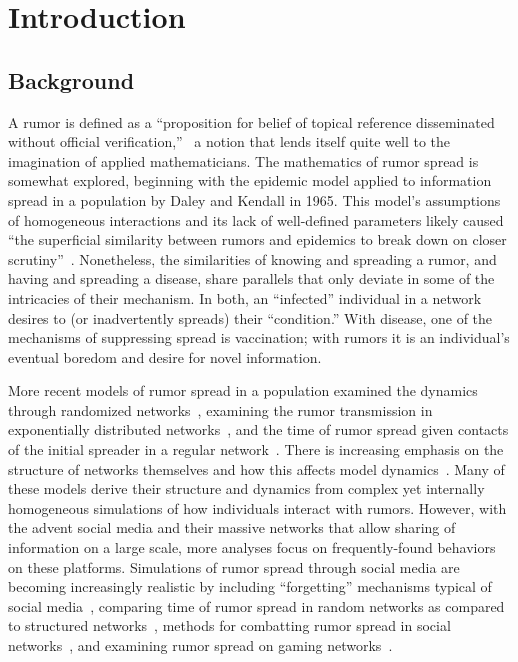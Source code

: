 \section{Introduction }
\label{sec:introduction}

\subsection{Background}
\label{subsec:background}

A rumor is defined as a ``proposition for belief of topical reference disseminated without official verification,''~\cite{knapp-1944} a notion that lends itself quite well to the imagination of applied mathematicians.
The mathematics of rumor spread is somewhat explored, beginning with the epidemic model applied to information spread in a population by Daley and Kendall in 1965.
This model's assumptions of homogeneous interactions and its lack of well-defined parameters likely caused ``the superficial similarity between rumors and epidemics to break down on closer scrutiny''~\cite{daley-1965}.
Nonetheless, the similarities of knowing and spreading a rumor, and having and spreading a disease, share parallels that only deviate in some of the intricacies of their mechanism.
In both, an ``infected'' individual in a network desires to (or inadvertently spreads) their ``condition.''
With disease, one of the mechanisms of suppressing spread is vaccination; with rumors it is an individual's eventual boredom and desire for novel information.

More recent models of rumor spread in a population examined the dynamics through randomized networks~\cite{karp-2000}, examining the rumor transmission in exponentially distributed networks~\cite{moreno-2004}, and the time of rumor spread given contacts of the initial spreader in a regular network~\cite{fount-2010}.
There is increasing emphasis on the structure of networks themselves and how this affects model dynamics~\cite{zhang-2013, pellis-2015, pellis-2012, ball-2010, zhou-2007}.
Many of these models derive their structure and dynamics from complex yet internally homogeneous simulations of how individuals interact with rumors.
However, with the advent social media and their massive networks that allow sharing of information on a large scale, more analyses focus on frequently-found behaviors on these platforms.
Simulations of rumor spread through social media are becoming increasingly realistic by including ``forgetting'' mechanisms typical of social media~\cite{zhao-2011}, comparing time of rumor spread in random networks as compared to structured networks~\cite{liu-2011}, methods for combatting rumor spread in social networks~\cite{tripathy-2010}, and examining rumor spread on gaming networks~\cite{grab-2008}.

